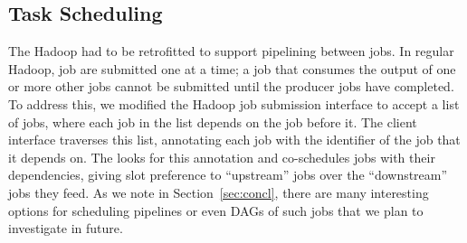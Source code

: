 \subsection{Task Scheduling}
\label{sec:pipeline-sched}

The Hadoop {\JT} had to be retrofitted to support pipelining between jobs. In
regular Hadoop, job are submitted one at a time; a job that consumes the output
of one or more other jobs cannot be submitted until the producer jobs have
completed. To address this, we modified the Hadoop job submission interface to
accept a list of jobs, where each job in the list depends on the job before
it. The client interface traverses this list, annotating each job with the
identifier of the job that it depends on. The {\JT} looks for this annotation
and co-schedules jobs with their dependencies, giving slot preference to
``upstream'' jobs over the ``downstream'' jobs they feed.  As we note in
Section~\ref{sec:concl}, there are many interesting options for scheduling
pipelines or even DAGs of such jobs that we plan to investigate in future.
